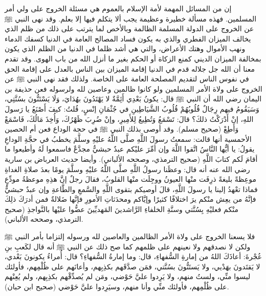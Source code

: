 إن من المسائل المهمة لأمة الإسلام بالعموم هي مسئلة الخروج على ولي أمر المسلمين. فهذه مسألة خطيرة وعظيمة يجب ألا يتكلم فيها إلا بعلم. 
وقد نهى النبي ﷺ عن الخروج على الدولة المسلمة الظالمة وبالأخص لما يترتب على ذلك من ظلم الذي يخالف الميزان الفطري والذي به يكون فساد المصالح العامة في الدنيا كسفك الدماء ونهب الأموال وهتك الأعراض، والتي هي أشد ظلما في الدنيا من الظلم الذي يكون بمخالفة الميزان الديني كمنع الزكاة أو الحكم بغير ما أنزل الله من باب الهوى. وقد تقدم معنا أن الله جل جلاله قدم في الدنيا إقامة الميزان بين الناس بالعدل على إقامة الحق في نفوس الناس لتقديم المصلحة العامة على الخاصة. ولذلك فقد نهى النبي ﷺ عن الخروج على ولاة الأمر المسلمين ولو كانوا ظالمين وعاصين لله ولرسوله فعن حذيفة بن اليمان رضي الله أن النبي ﷺ قال: يكونُ بَعْدِي أَئِمَّةٌ لا يَهْتَدُونَ بهُدَايَ، وَلَا يَسْتَنُّونَ بسُنَّتِي، وَسَيَقُومُ فيهم رِجَالٌ قُلُوبُهُمْ قُلُوبُ الشَّيَاطِينِ في جُثْمَانِ إنْسٍ، قُلتُ: كيفَ أَصْنَعُ يا رَسولَ اللهِ، إنْ أَدْرَكْتُ ذلكَ؟ قالَ: تَسْمَعُ وَتُطِيعُ لِلأَمِيرِ، وإنْ ضُرِبَ ظَهْرُكَ، وَأُخِذَ مَالُكَ، فَاسْمَعْ وَأَطِعْ {\footnotesize (صحيح مسلم)}. وقد أوصى بذلك النبي ﷺ في حجة الوداع فعن أم الحصين الأحمسية أنها قالت: سمعتُ رسولَ اللَّهِ صلَّى اللَّهُ عليْهِ وسلَّمَ يخطبُ في حجَّةِ الوداعِ   يقولُ: يا أيُّها النَّاسُ اتَّقوا اللَّهَ وإن أمِّرَ عليْكم عبدٌ حبشيٌّ مجدَّعٌ فاسمعوا لَهُ وأطيعوا ما أقامَ لَكم كتابَ اللَّهِ  {\footnotesize (صحيح الترمذي، وصححه الألباني)}. وأيضا حديث العرباض بن سارية رضي الله عنه أنه قال: وعظَنا رسولُ اللَّهِ صلَّى اللَّهُ عليْهِ وسلَّمَ يومًا بعدَ صلاةِ الغداةِ موعِظةً بليغةً ذرِفَت منْها العيونُ ووجِلَت منْها القلوبُ، فقالَ رجلٌ إنَّ هذِهِ موعظةُ مودِّعٍ فماذا تعْهدُ إلينا يا رسولَ اللَّهِ، قالَ أوصيكم بتقوى اللَّهِ والسَّمعِ والطَّاعةِ وإن عبدٌ حبشيٌّ فإنَّهُ من يعِش منْكم يرَ اختلافًا كثيرًا وإيَّاكم ومحدَثاتِ الأمورِ فإنَّها ضَلالةٌ فمن أدرَكَ ذلِكَ منْكم فعليْهِ بِسُنَّتي وسنَّةِ الخلفاءِ الرَّاشدينَ المَهديِّينَ عضُّوا عليْها بالنَّواجذِ {\footnotesize (صحيح الترمذي، وصححه الألباني)}.

فلا يسعنا الخروج على ولاة الأمر الظالمين والعاصين لله ورسوله إلتزاما بأمر النبي ﷺ ولكن لا نصدقهم ولا نعينهم على ظلمهم كما صح ذلك عن النبي ﷺ أنه قال لكَعبِ بنِ عُجْرةَ: أعاذَكَ اللهُ من إمارةِ السُّفهاءِ، قال: وما إمارةُ السُّفهاءِ؟ قال: أُمراءُ يكونونَ بَعْدي، لا يَقتَدونَ بهَدْيي، ولا يَستَنُّونَ بسُنَّتي، فمَن صدَّقَهم بكذِبِهم، وأعانَهم على ظُلْمِهم، فأولئك ليسوا منِّي، ولستُ منهم، ولا يَرِدوا عليَّ حَوْضي، ومَن لم يُصدِّقْهم بكذِبِهم، ولم يُعِنْهم على ظُلْمِهم، فأولئك منِّي وأنا منهم، وسيَرِدوا عليَّ حَوْضي {\footnotesize (صحيح ابن حبان)}.


